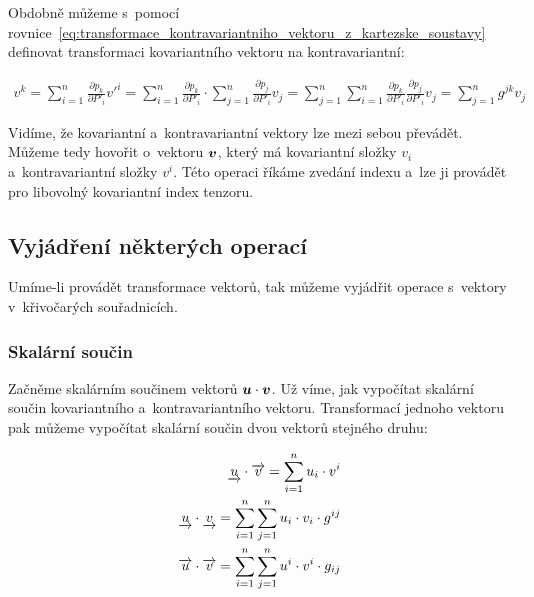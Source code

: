 Obdobně můžeme s~pomocí rovnice~\eqref{eq:transformace_kontravariantniho_vektoru_z_kartezske_soustavy} definovat transformaci kovariantního vektoru na kontravariantní:

\begin{equation}
\begin{split}
v^k = \sum_{i=1}^n \frac{\partial p_k}{\partial P'_i} v'^i = \sum_{i=1}^n \frac{\partial p_k}{\partial P'_i} \cdot \sum_{j=1}^n \frac{\partial p_j}{\partial P'_i} v_j = \sum_{j=1}^n \sum_{i=1}^n \frac{\partial p_k}{\partial P'_i} \frac{\partial p_j}{\partial P'_i} v_j = \sum_{j=1}^n g^{jk} v_j
\end{split}
\end{equation}

Vidíme, že kovariantní a~kontravariantní vektory lze mezi sebou převádět. Můžeme tedy hovořit o~vektoru \(\boldsymbol{v}\), který má kovariantní složky \(v_i\) a~kontravariantní složky \(v^i\). Této operaci říkáme zvedání indexu a~lze ji provádět pro libovolný kovariantní index tenzoru.

\subsection{Vyjádření některých operací}

Umíme-li provádět transformace vektorů, tak můžeme vyjádřit operace s~vektory v~křivočarých souřadnicích. 

\subsubsection{Skalární součin}

Začněme skalárním součinem vektorů \(\boldsymbol{u} \cdot \boldsymbol{v}\). Už víme, jak vypočítat skalární součin kovariantního a~kontravariantního vektoru. Transformací jednoho vektoru pak můžeme vypočítat skalární součin dvou vektorů stejného druhu:

\begin{fact}
\begin{equation}
\begin{split}
\underrightarrow{u} \cdot \overrightarrow{v} = \sum_{i=1}^n u_i \cdot v^i \\
\underrightarrow{u} \cdot \underrightarrow{v} = \sum_{i=1}^n \sum_{j=1}^n u_i \cdot v_i \cdot g^{ij} \\
\overrightarrow{u} \cdot \overrightarrow{v} = \sum_{i=1}^n \sum_{j=1}^n u^i \cdot v^i \cdot g_{ij}
\end{split}
\end{equation}
\end{fact}

